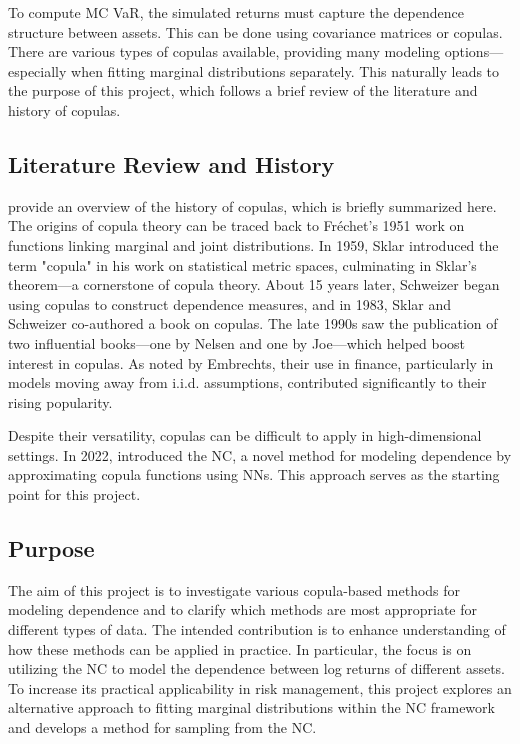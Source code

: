 To compute \gls{MC} \gls{VaR}, the simulated returns must capture the dependence structure between assets. This can be done using covariance matrices or copulas. There are various types of copulas available, providing many modeling options—especially when fitting marginal distributions separately. This naturally leads to the purpose of this project, which follows a brief review of the literature and history of copulas.

\subsection{Literature Review and History}\label{LiteratureReview}
 provide an overview of the history of copulas, which is briefly summarized here. The origins of copula theory can be traced back to Fréchet’s 1951 work on functions linking marginal and joint distributions. In 1959, Sklar introduced the term "copula" in his work on statistical metric spaces, culminating in Sklar’s theorem—a cornerstone of copula theory. About 15 years later, Schweizer began using copulas to construct dependence measures, and in 1983, Sklar and Schweizer co-authored a book on copulas. The late 1990s saw the publication of two influential books—one by Nelsen and one by Joe—which helped boost interest in copulas. As noted by Embrechts, their use in finance, particularly in models moving away from i.i.d. assumptions, contributed significantly to their rising popularity.

Despite their versatility, copulas can be difficult to apply in high-dimensional settings. In 2022,  introduced the \gls{NC}, a novel method for modeling dependence by approximating copula functions using \gls{NN}s. This approach serves as the starting point for this project.

\subsection{Purpose}\label{Purpose}
The aim of this project is to investigate various copula-based methods for modeling dependence and to clarify which methods are most appropriate for different types of data. The intended contribution is to enhance understanding of how these methods can be applied in practice. In particular, the focus is on utilizing the \gls{NC} to model the dependence between log returns of different assets. To increase its practical applicability in risk management, this project explores an alternative approach to fitting marginal distributions within the \gls{NC} framework and develops a method for sampling from the \gls{NC}. 


